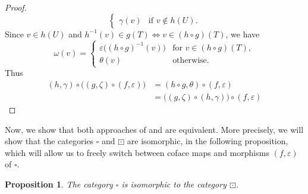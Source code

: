 \documentclass[11pt,a4paper,oldfontcommands]{memoir}
\newtheorem{proposition}[definition]{Proposition}
\begin{document}
\begin{proof}
\begin{equation*}
\begin{cases}
        \gamma(v) & \text{if $v \notin h(U)$}.
      \end{cases}
    \end{equation*}
    Since $v\in h(U)$ and $h^{-1}(v) \in g(T) \Leftrightarrow v \in (h \circ g) (T)$, we have
 \begin{equation*}
   \omega(v)=
      \begin{cases}
        \varepsilon \bigl((h \circ g)^{-1}(v)\bigl) & \text{for $v\in (h \circ g )(T)$}, \\
        \theta(v) & \text{otherwise}.
      \end{cases}
  \end{equation*}
Thus
  \begin{align*}
(h,\gamma) \circ \bigl( (g,\zeta) \circ (f,\varepsilon) \bigl) &=   (h \circ g,\theta) \circ (f,\varepsilon) \\
 &=  \bigl( (g,\zeta)  \circ (h,\gamma) \bigl)  \circ (f,\varepsilon)     
  \end{align*}
\end{proof}
Now, we show that both approaches of \cite{LanguageofHDA} and \cite{KleeneTh} are equivalent. More precisely, we will show that the categories $\square$ and $\boxdot$ are isomorphic, in the following proposition, which will allow us to freely switch between coface maps and morphisms $(f,\varepsilon)$ of $\square$.
\begin{proposition}
The category $\square$ is isomorphic to the category $\boxdot$.   
\end{proposition}
\end{document}
